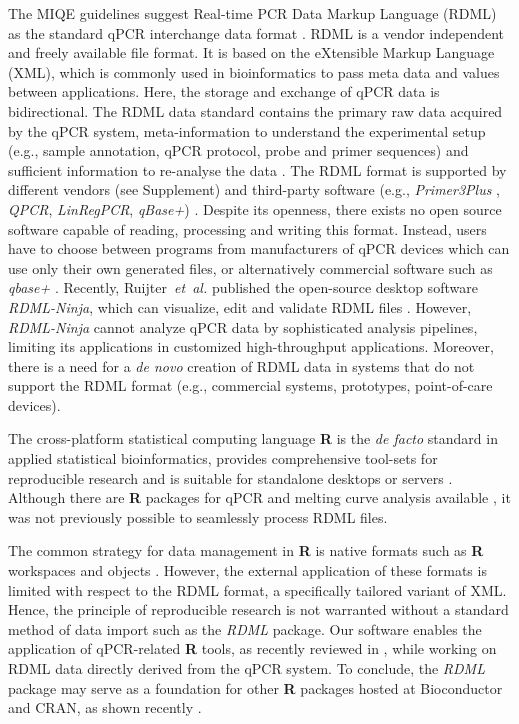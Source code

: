 \documentclass{bioinfo}
\begin{document}
The MIQE guidelines suggest Real-time PCR Data Markup Language (RDML) as the standard 
qPCR interchange data format \cite{rdml-ninja_2015}. RDML is a vendor 
independent and freely available file format.  It is based on the 
eXtensible Markup Language (XML), which is commonly used in bioinformatics 
\cite{achard_xml_2001} to pass meta data and values between applications. 
Here, the storage and exchange of qPCR data is bidirectional. The RDML data standard 
contains the primary raw data acquired by the qPCR system, meta-information to 
understand the experimental setup (e.g., sample annotation, qPCR protocol, probe 
and primer sequences) and sufficient information to re-analyse the data 
\cite{lefever_rdml_2009}. The RDML format is supported by different vendors (see 
Supplement) and third-party software (e.g., \textit{Primer3Plus} 
\cite{untergasser_2007}, \textit{QPCR}, \textit{LinRegPCR}, \textit{qBase+}) 
\cite{pabinger_2014, rdml-ninja_2015}. Despite  its openness, 
there exists no open source software capable of reading, processing and writing 
this format. Instead, users have to choose between programs from manufacturers of qPCR 
devices which can use only their own generated files, or alternatively commercial software 
such as \textit{qbase+} \cite{pabinger_2014, rdml-ninja_2015}. Recently, 
Ruijter~\textit{et~al.} published the open-source desktop software 
\textit{RDML-Ninja}, which can visualize, edit and validate RDML files 
\cite{rdml-ninja_2015}. However, \textit{RDML-Ninja} cannot analyze qPCR 
data by sophisticated analysis pipelines, limiting its applications in 
customized high-throughput applications. Moreover, there is a need for a \textit{de novo} 
creation of RDML data in systems that do not 
support the RDML format (e.g., commercial systems, prototypes, point-of-care devices). 

The cross-platform statistical computing language \textbf{R} is  the \textit{de facto} standard in applied 
statistical bioinformatics, provides comprehensive tool-sets for reproducible research \cite{leeper_archiving_2014, 
liu_r_2014, roediger2015r} and is suitable for standalone desktops or servers \cite{roediger2015r}. 
Although there are \textbf{R} packages for qPCR and melting 
curve analysis available \cite{pabinger_2014, ritz_qpcr_2008, 
roediger_RJ_2013, roediger2015chippcr}, it was not previously possible 
to seamlessly process RDML files.

The common strategy for data management in \textbf{R}  is native formats such 
as  \textbf{R} workspaces  and objects \cite{roediger_rkward_2012}. However, 
the external application of these  formats is limited with respect to the RDML format, 
a specifically tailored variant of XML. Hence, the principle of reproducible research 
is not warranted without a standard method of data import such as the \textit{RDML} 
package. Our software enables  the application of  qPCR-related \textbf{R} tools, as 
recently reviewed in \cite{pabinger_2014}, while working on  RDML data directly 
derived  from the qPCR system. To conclude, the \textit{RDML} package may 
serve as a foundation for other \textbf{R} packages hosted at Bioconductor 
\cite{gentleman_2004} and CRAN, as shown recently \cite{roediger2015r}.
\end{document}
